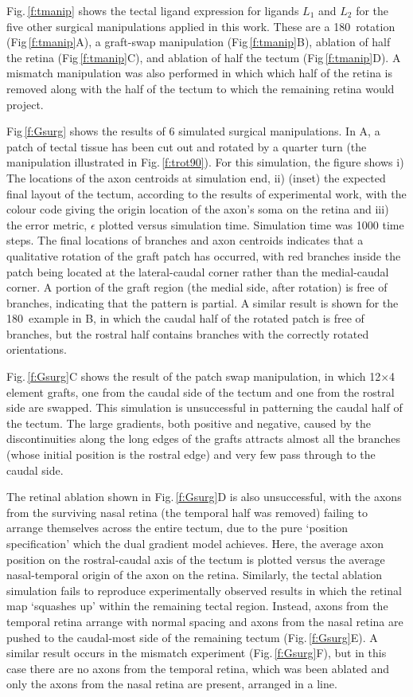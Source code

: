 \documentclass[11pt, a4paper]{article}
\begin{document}
Fig.\,\ref{f:tmanip} shows the tectal ligand expression for ligands $L_1$ and
$L_2$ for the five other surgical manipulations applied in this work. These
are a 180\degree~rotation (Fig\,\ref{f:tmanip}A), a graft-swap manipulation
(Fig\,\ref{f:tmanip}B), ablation of half the retina (Fig\,\ref{f:tmanip}C),
and ablation of half the tectum (Fig\,\ref{f:tmanip}D). A mismatch
manipulation was also performed in which which half of the retina is removed
along with the half of the tectum to which the remaining retina would project.

Fig\,\ref{f:Gsurg} shows the results of 6 simulated surgical
manipulations. In A, a patch of tectal tissue has been cut out and rotated by
a quarter turn (the manipulation illustrated in Fig.\,\ref{f:trot90}). For
this simulation, the figure shows i) The locations of the axon centroids at
simulation end, ii) (inset) the expected final layout of the tectum, according
to the results of experimental work, with the colour code giving the origin
location of the axon's soma on the retina and iii) the error metric,
$\epsilon$ plotted versus simulation time. Simulation time was 1000 time
steps. The final locations of branches and axon centroids indicates that a
qualitative rotation of the graft patch has occurred, with red branches inside
the patch being located at the lateral-caudal corner rather than the
medial-caudal corner. A portion of the graft region (the medial side, after
rotation) is free of branches, indicating that the pattern is partial. A
similar result is shown for the 180\degree~example in B, in which the caudal
half of the rotated patch is free of branches, but the rostral half contains
branches with the correctly rotated orientations.

Fig.\,\ref{f:Gsurg}C shows the result of the patch swap manipulation, in
which 12$\times$4 element grafts, one from the caudal side of the tectum and one from
the rostral side are swapped. This simulation is unsuccessful in patterning
the caudal half of the tectum. The large gradients, both positive and
negative, caused by the discontinuities along the long edges of the grafts
attracts almost all the branches (whose initial position is the rostral edge)
and very few pass through to the caudal side.

The retinal ablation shown in Fig.\,\ref{f:Gsurg}D is also unsuccessful, with
the axons from the surviving nasal retina (the temporal half was removed)
failing to arrange themselves across the entire tectum, due to the pure
`position specification' which the dual gradient model achieves. Here, the
average axon position on the rostral-caudal axis of the tectum is plotted versus the average
nasal-temporal origin of the axon on the retina. Similarly,
the tectal ablation simulation fails to reproduce experimentally observed
results in which the retinal map `squashes up' within the remaining tectal
region. Instead, axons from the temporal retina arrange with normal spacing
and axons from the nasal retina are pushed to the caudal-most side of the
remaining tectum (Fig.\,\ref{f:Gsurg}E). A similar result occurs in the
mismatch experiment (Fig.\,\ref{f:Gsurg}F), but in this case there are no
axons from the temporal retina, which was been ablated and only the axons
from the nasal retina are present, arranged in a line.
\end{document}
